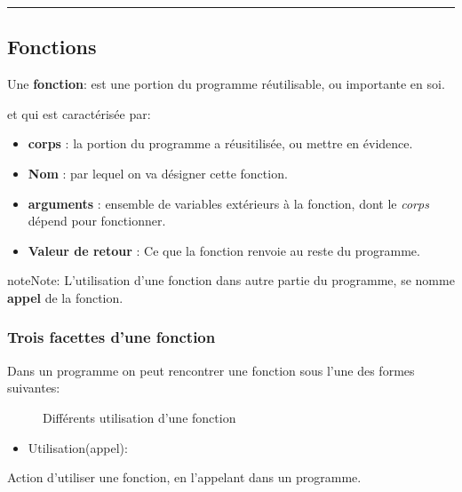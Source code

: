 \documentclass[letterpaper,10pt,english]{sphinxmanual}
\begin{document}
\bigskip\hrule{}\bigskip



\subsection{Fonctions}
\label{fonctions:fonctions}
Une \textbf{fonction}: est une portion du programme réutilisable, ou importante en soi.

et qui est caractérisée par:
\begin{itemize}
\item {} 
\textbf{corps} : la portion du programme a réusitilisée, ou mettre en évidence.

\item {} 
\textbf{Nom}   : par lequel on va désigner cette fonction.

\item {} 
\textbf{arguments} : ensemble de variables extérieurs à la fonction, dont le \emph{corps} dépend pour fonctionner.

\item {} 
\textbf{Valeur de retour} : Ce que la fonction renvoie au reste du programme.

\end{itemize}

\begin{notice}{note}{Note:}
L'utilisation d'une fonction dans autre partie du programme, se nomme \textbf{appel} de la fonction.
\end{notice}


\subsubsection{Trois facettes d'une fonction}
\label{fonctions:trois-facettes-d-une-fonction}
Dans un programme on peut rencontrer une fonction sous l'une des formes suivantes:
\begin{figure}[htbp]
\centering
\capstart

\caption{Différents utilisation d'une fonction}\end{figure}
\begin{itemize}
\item {} 
Utilisation(appel):

\end{itemize}

Action d'utiliser une fonction, en l'appelant dans un programme.
\end{document}
